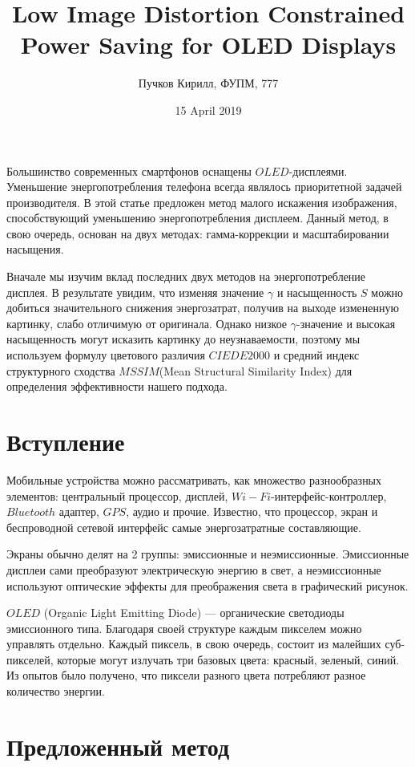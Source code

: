 \documentclass[a4paper, 12pt]{article}
\title{Low Image Distortion Constrained Power Saving for OLED  Displays}
\author{Пучков Кирилл, ФУПМ, 777}
\date{15 April 2019}
\begin{document}
\maketitle

	Большинство современных смартфонов оснащены $OLED$-дисплеями. Уменьшение энергопотребления телефона всегда являлось приоритетной задачей производителя. В этой статье предложен метод малого искажения изображения, способствующий уменьшению энергопотребления дисплеем. Данный метод, в свою очередь, основан на двух методах: гамма-коррекции и масштабировании насыщения.
	
	Вначале мы изучим вклад последних двух методов на энергопотребление дисплея. В результате увидим, что изменяя значение $\gamma$ и насыщенность $S$ можно добиться значительного снижения энергозатрат, получив на выходе измененную картинку, слабо отличимую от оригинала. Однако низкое $\gamma$-значение и высокая насыщенность могут исказить картинку до неузнаваемости, поэтому мы используем формулу цветового различия $CIEDE2000$ и средний индекс структурного сходства $MSSIM$(Mean Structural Similarity Index) для определения эффективности нашего подхода.
	
\newpage
\section*{Вступление}

	Мобильные устройства можно рассматривать, как множество разнообразных элементов: центральный процессор, дисплей, $Wi-Fi$-интерфейс-контроллер, $Bluetooth$ адаптер, $GPS$, аудио и прочие. Известно, что процессор, экран и беспроводной сетевой интерфейс  самые энергозатратные составляющие.
	
	Экраны обычно делят на 2 группы: эмиссионные и неэмиссионные. Эмиссионные дисплеи сами преобразуют электрическую энергию в свет, а неэмиссионные используют оптические эффекты для преображения света в графический рисунок.
    
    $OLED$ (Organic Light Emitting Diode) — органические светодиоды эмиссионного типа. Благодаря своей структуре каждым пикселем можно управлять отдельно. Каждый пиксель, в свою очередь, состоит из малейших суб-пикселей, которые могут излучать три базовых цвета: красный, зеленый, синий. Из опытов было получено, что пиксели разного цвета потребляют разное количество энергии.
    
\newpage
\section*{Предложенный метод}
\end{document}
